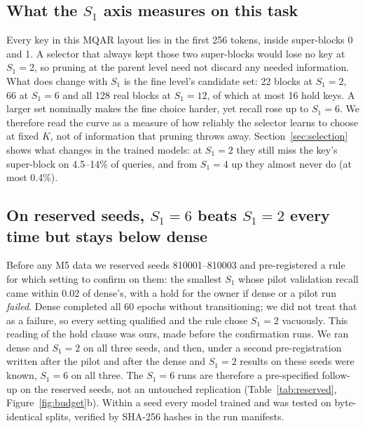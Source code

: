 \subsection{What the $S_1$ axis measures on this task}

Every key in this MQAR layout lies in the first 256 tokens, inside super-blocks 0 and 1. A selector that always kept
those two super-blocks would lose no key at $S_1{=}2$, so pruning at the parent level need not discard any needed
information. What does change with $S_1$ is the fine level's candidate set: 22 blocks at $S_1{=}2$, 66 at $S_1{=}6$ and all 128 real blocks at $S_1{=}12$, of which at most 16 hold keys. A larger set nominally makes the fine choice harder, yet recall rose
up to $S_1{=}6$. We therefore read the curve as a measure of how reliably the selector learns to choose at fixed $K$,
not of information that pruning throws away. Section~\ref{sec:selection} shows what changes in the trained models: at $S_1{=}2$ they still
miss the key's super-block on 4.5--14\% of queries, and from $S_1{=}4$ up they almost never do (at most 0.4\%).

\subsection{On reserved seeds, $S_1{=}6$ beats $S_1{=}2$ every time but stays below dense}

Before any M5 data we reserved seeds 810001--810003 and pre-registered a rule for which setting to confirm on them:
the smallest $S_1$ whose pilot validation recall came within 0.02 of dense's, with a hold for the owner if dense or a
pilot run \emph{failed}. Dense completed all 60 epochs without transitioning; we did not treat that as a failure, so
every setting qualified and the rule chose $S_1{=}2$ vacuously. This reading of the hold clause was ours, made before
the confirmation runs. We ran dense and $S_1{=}2$ on all three seeds, and then, under a second pre-registration written
after the pilot and after the dense and $S_1{=}2$ results on these seeds were known, $S_1{=}6$ on all three. The
$S_1{=}6$ runs are therefore a pre-specified follow-up on the reserved seeds, not an untouched replication (Table~\ref{tab:reserved}, Figure~\ref{fig:budget}b). Within a seed every
model trained and was tested on byte-identical splits, verified by SHA-256 hashes in the run manifests.

